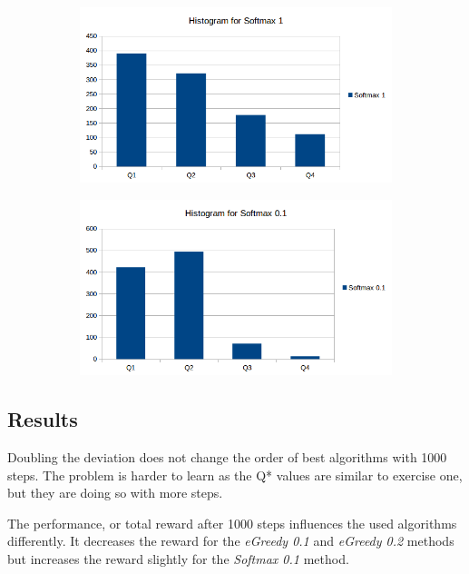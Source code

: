 \documentclass[a4paper, 11pt]{article}
\begin{document}
\begin{figure}[H]
\begin{subfigure}{.5\textwidth}
  \centering
  \includegraphics[width=1\linewidth]{ex1_2_histogram_softmax1}
\end{subfigure}%
\begin{subfigure}{.5\textwidth}
  \centering
  \includegraphics[width=1\linewidth]{ex1_2_histogram_softmax01}
\end{subfigure}%
\end{figure}

\subsection{Results}


Doubling the deviation does not change the order of best algorithms with 1000 steps. The problem is harder to learn as the Q* values are similar to exercise one, but they are doing so with more steps.

The performance, or total reward after 1000 steps influences the used algorithms differently. It decreases the reward for the \textit{eGreedy 0.1} and \textit{eGreedy 0.2} methods but increases the reward slightly for the \textit{Softmax 0.1} method.
\end{document}
